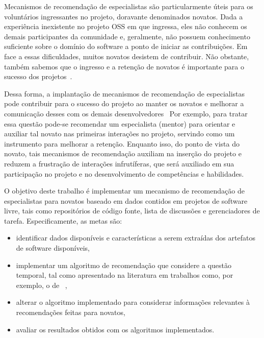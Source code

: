\documentclass[oneside,brazil,a4paper]{normas-utf-tex}
\begin{document}
Mecanismos de recomendação de especialistas são particularmente úteis para os voluntários ingressantes no projeto, doravante denominados novatos. Dada a experiência inexistente no projeto OSS em que ingressa, eles não conhecem os demais participantes da comunidade e, geralmente, não possuem conhecimento suficiente sobre o domínio do software a ponto de iniciar as contribuições. Em face a essas dificuldades, muitos novatos desistem de contribuir. Não obstante, também sabemos que o ingresso e a retenção de novatos é importante para o sucesso dos projetos~\cite{Yunrim-etal:2009}. 

Dessa forma, a implantação de mecanismos de recomendação de especialistas pode contribuir para o sucesso do projeto ao manter os novatos e melhorar a comunicação desses com os demais desenvolvedores~\cite{Steinmacher-etal:2012} Por exemplo, para tratar essa questão pode-se recomendar um especialista (mentor) para orientar e auxiliar tal novato nas primeiras interações no projeto, servindo como um instrumento para melhorar a retenção. Enquanto isso, do ponto de vista do novato, tais mecanismos de recomendação auxiliam na inserção do projeto e reduzem a frustração de interações infrutíferas, que será auxiliado em sua participação no projeto e no desenvolvimento de competências e habilidades.

O objetivo deste trabalho é implementar um mecanismo de recomendação de especialistas para novatos baseado em dados contidos em projetos de software livre, tais como repositórios de código fonte, lista de discussões e gerenciadores de tarefa. Especificamente, as metas são:

\begin{itemize}
    \item identificar dados disponíveis e características a serem extraídas dos artefatos de software disponíveis,

    \item implementar um algoritmo de recomendação que considere a questão temporal, tal como apresentado na literatura em trabalhos como, por exemplo, o de ~,

    \item alterar o algoritmo implementado para considerar informações relevantes à recomendações feitas para novatos,
    
    \item avaliar os resultados obtidos com os algoritmos implementados.
\end{itemize}
\end{document}
